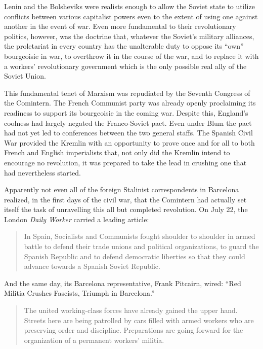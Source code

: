Lenin and the Bolsheviks were realists enough to allow the Soviet state to utilize conflicts between various capitalist powers even to the extent of using one against another in the event of war. Even more fundamental to their revolutionary politics, however, was the doctrine that, whatever the Soviet’s military alliances, the proletariat in every country has the unalterable duty to oppose its ``own'' bourgeoisie in war, to overthrow it in the course of the war, and to replace it with a workers’ revolutionary government which is the only possible real ally of the Soviet Union.

This fundamental tenet of Marxism was repudiated by the Seventh Congress of the Comintern. The French Communist party was already openly proclaiming its readiness to support its bourgeoisie in the coming war. Despite this, England’s coolness had largely negated the Franco-Soviet pact. Even under Blum the pact had not yet led to conferences between the two general staffs. The Spanish Civil War provided the Kremlin with an opportunity to prove once and for all to both French and English imperialists that, not only did the Kremlin intend to encourage no revolution, it was prepared to take the lead in crushing one that had nevertheless started.

Apparently not even all of the foreign Stalinist correspondents in Barcelona realized, in the first days of the civil war, that the Comintern had actually set itself the task of unravelling this all but completed revolution. On July 22, the London \emph{Daily Worker} carried a leading article:

\begin{quotation}
  In Spain, Socialists and Communists fought shoulder to shoulder in armed battle to defend their trade unions and political organizations, to guard the Spanish Republic and to defend democratic liberties so that they could advance towards a Spanish Soviet Republic.
\end{quotation}

And the same day, its Barcelona representative, Frank Pitcairn, wired: ``Red Militia Crushes Fascists, Triumph in Barcelona.''

\begin{quotation}
  The united working-class forces have already gained the upper hand. Streets here are being patrolled by cars filled with armed workers who are preserving order and discipline. Preparations are going forward for the organization of a permanent workers’ militia.
\end{quotation}


